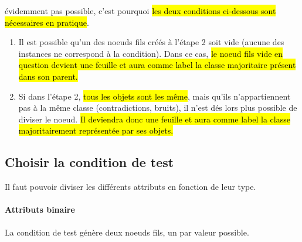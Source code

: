 \documentclass[letterpaper, 12pt]{article}
\newcommand{\alinea}{
\hspace*{0.5cm}}
\begin{document}
				évidemment pas possible, c'est pourquoi \hl{les deux 
				conditions ci-dessous sont nécessaires en pratique}.
			\begin{enumerate}
				\item Il est possible qu'un des noeuds fils créés à l'étape
				2 soit vide (aucune des instances ne correspond à la
				condition).
				Dans ce cas, \hl{le noeud fils vide en question devient une 
				feuille et aura comme label la classe majoritaire présent
				dans son parent.}
				\item Si dans l'étape 2, \hl{tous les objets sont les même},
				mais qu'ils n'appartiennent pas à la même classe
				(contradictions, bruits), il n'est dés lors plus 
				possible de diviser le noeud.
				\hl{Il deviendra donc une feuille et aura comme label
				la classe majoritairement représentée par ses objets.}
			\end{enumerate}
		\subsection{Choisir la condition de test}\label{sec:tree:test_cond}
			\alinea Il faut pouvoir diviser les différents attributs en
				fonction de leur type.
			\paragraph{Attributs binaire} La condition de test génère deux
				noeuds fils, un par valeur possible.
\end{document}
